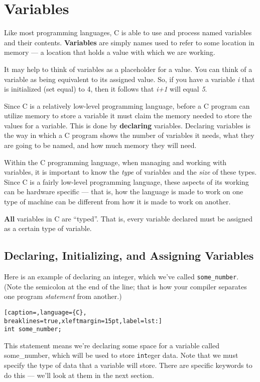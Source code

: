 \section{Variables}
Like most programming languages, C is able to use and process named variables
and their contents. \textbf{Variables} are simply names used to refer to some
location in memory --- a location that holds a value with which we are working. 

It may help to think of variables as a placeholder for a value. You can think
of a variable as being equivalent to its assigned value. So, if you have a
variable \emph{i} that is initialized (set equal) to 4, then it follows that
\emph{i+1} will equal \emph{5}.

Since C is a relatively low-level programming language, before a C program can
utilize memory to store a variable it must claim the memory needed to store the
values for a variable. This is done by \textbf{declaring} variables. Declaring
variables is the way in which a C program shows the number of variables it
needs, what they are going to be named, and how much memory they will need.

Within the C programming language, when managing and working with variables, it
is important to know the \emph{type} of variables and the \emph{size} of these
types. Since C is a fairly low-level programming language, these aspects of its
working can be hardware specific --- that is, how the language is made to work
on one type of machine can be different from how it is made to work on another.

\textbf{All} variables in C are ``typed''. That is, every variable declared
must be assigned as a certain type of variable.

\subsection{Declaring, Initializing, and Assigning Variables}
Here is an example of declaring an integer, which we've called
\texttt{some\_number}. (Note the semicolon at the end of the line; that is how
your compiler separates one program \emph{statement} from another.)
\lstset{basicstyle=\scriptsize, numbers=left, captionpos=b, tabsize=4}
\begin{lstlisting}[caption=,language={C},
breaklines=true,xleftmargin=15pt,label=lst:]
int some_number;
\end{lstlisting}

This statement means we're declaring some space for a variable called
some\_number, which will be used to store \texttt{int}eger data. Note that we
must specify the type of data that a variable will store. There are specific
keywords to do this --- we'll look at them in the next section.

